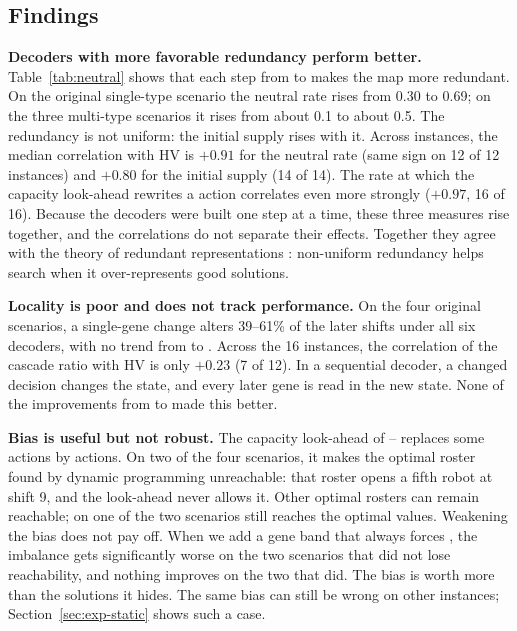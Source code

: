 \subsection{Findings}
\label{sec:repr:findings}

\textbf{Decoders with more favorable redundancy perform better.}
Table~\ref{tab:neutral} shows that each step from  to  makes the map more redundant.
On the original single-type scenario the neutral rate rises from 0.30 to 0.69; on the three multi-type scenarios it rises from about 0.1 to about 0.5.
The redundancy is not uniform: the initial supply rises with it.
Across instances, the median correlation with HV is $+0.91$ for the neutral rate (same sign on 12 of 12 instances)
and $+0.80$ for the initial supply (14 of 14).
The rate at which the capacity look-ahead rewrites a \new action correlates even more strongly ($+0.97$, 16 of 16).
Because the decoders were built one step at a time, these three measures rise together, and the correlations do not separate their effects.
Together they agree with the theory of redundant representations \cite{rothlauf2006representations}:
non-uniform redundancy helps search when it over-represents good solutions.

\textbf{Locality is poor and does not track performance.}
On the four original scenarios, a single-gene change alters 39--61\% of the later shifts under all six decoders, with no trend from  to .
Across the 16 instances, the correlation of the cascade ratio with HV is only $+0.23$ (7 of 12).
In a sequential decoder, a changed decision changes the state, and every later gene is read in the new state.
None of the improvements from  to  made this better.

\textbf{Bias is useful but not robust.}
The capacity look-ahead of -- replaces some \new actions by \reuse actions.
On two of the four scenarios, it makes the optimal roster found by dynamic programming unreachable: that roster opens a fifth robot at shift 9, and the look-ahead never allows it.
Other optimal rosters can remain reachable; on one of the two scenarios  still reaches the optimal values.
Weakening the bias does not pay off.
When we add a gene band that always forces \new, the imbalance gets significantly worse on the two scenarios that did not lose reachability,
and nothing improves on the two that did.
The bias is worth more than the solutions it hides.
The same bias can still be wrong on other instances; Section~\ref{sec:exp-static} shows such a case.

